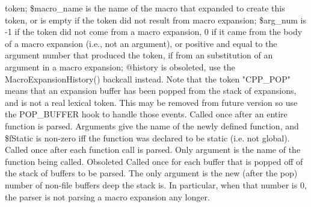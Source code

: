 token; \$macro\_\-name is the name of the macro that expanded to create this token,
or is empty if the token did not result from macro expansion; \$arg\_\-num is -1
if the token did not come from a macro expansion, 0 if it came from the
body of a macro expansion (i.e., not an argument), or positive and equal
to the argument number that produced the token, if from an substitution
of an argument in a macro expansion; @history is obsoleted, use the
MacroExpansionHistory() backcall instead.  Note that the token "CPP\_\-POP"
means that an expansion buffer has been popped from the stack of expansions,
and is not a real lexical token.  This may be removed from future version
so use the POP\_\-BUFFER hook to handle those events.
Called once after an entire function is parsed.  Arguments
give the name of the newly defined function, and \$fStatic is non-zero
iff the function was declared to be static (i.e. not global).
Called once after each function call is parsed.  Only argument is
the name of the function being called.
 Obsoleted
Called once for each buffer that is popped off of the stack of
buffers to be parsed. The only argument is the new (after the pop)
number of non-file buffers
deep the stack is.  In particular, when that number is 0, 
the parser is not parsing a macro expansion any longer.
